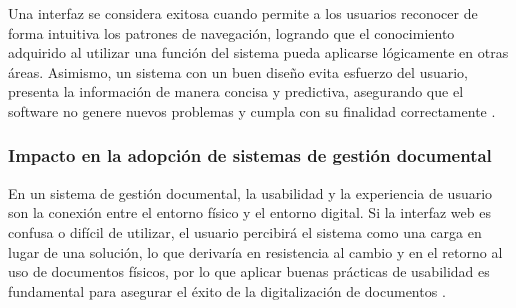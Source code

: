 Una interfaz se considera exitosa cuando permite a los usuarios reconocer de forma intuitiva los patrones de navegación, logrando que el conocimiento adquirido al utilizar una función del sistema pueda aplicarse lógicamente en otras áreas. Asimismo, un sistema con un buen diseño evita esfuerzo del usuario, presenta la información de manera concisa y predictiva, asegurando que el software no genere nuevos problemas y cumpla con su finalidad correctamente \cite{chihuahuaUX2024}.

\subsubsection{Impacto en la adopción de sistemas de gestión documental}
En un sistema de gestión documental, la usabilidad y la experiencia de usuario son la conexión entre el entorno físico y el entorno digital. Si la interfaz web es confusa o difícil de utilizar, el usuario percibirá el sistema como una carga en lugar de una solución, lo que derivaría en resistencia al cambio y en el retorno al uso de documentos físicos, por lo que aplicar buenas prácticas de usabilidad es fundamental para asegurar el éxito de la digitalización de documentos \cite{ferrer2023aplicabilidad}.